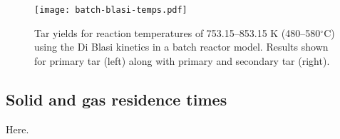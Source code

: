 \begin{figure}[H]
    \centering
    \texttt{[image: batch-blasi-temps.pdf]}
    \caption{Tar yields for reaction temperatures of 753.15--853.15 K (480--580$^\circ$C) using the Di Blasi kinetics in a batch reactor model. Results shown for primary tar (left) along with primary and secondary tar (right).}
    \label{fig:batch-blasi-temps}
\end{figure}

\subsection{Solid and gas residence times}

Here.
